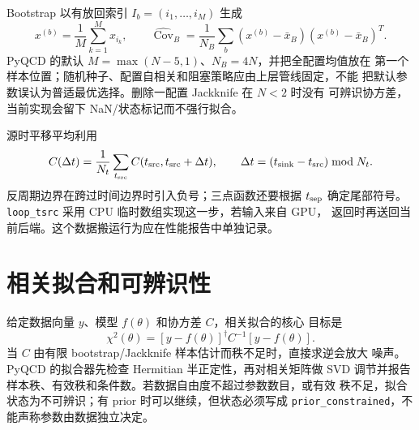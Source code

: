 \documentclass[UTF8,11pt,oneside]{ctexbook}
\begin{document}
Bootstrap 以有放回索引 \(I_b=(i_1,\ldots,i_M)\) 生成
\begin{equation}
 x^{(b)}=\frac1M\sum_{k=1}^{M}x_{i_k},\qquad
 \widehat{\operatorname{Cov}}_B
 =\frac1{N_B}\sum_b(x^{(b)}-\bar x_B)(x^{(b)}-\bar x_B)^T.
\end{equation}
PyQCD 的默认 \(M=\max(N-5,1)\)、\(N_B=4N\)，并把全配置均值放在
第一个样本位置；随机种子、配置自相关和阻塞策略应由上层管线固定，不能
把默认参数误认为普适最优选择。删除一配置 Jackknife 在 \(N<2\) 时没有
可辨识协方差，当前实现会留下 NaN/状态标记而不强行拟合。

源时平移平均利用
\begin{equation}
 C(\Delta t)=\frac1{N_t}\sum_{t_{\rm src}}
 C(t_{\rm src},t_{\rm src}+\Delta t),\qquad
 \Delta t=(t_{\rm sink}-t_{\rm src})\bmod N_t.
\end{equation}
反周期边界在跨过时间边界时引入负号；三点函数还要根据 \(t_{\rm sep}\)
确定尾部符号。\texttt{loop\_tsrc} 采用 CPU 临时数组实现这一步，若输入来自 GPU，
返回时再送回当前后端。这个数据搬运行为应在性能报告中单独记录。

\section{相关拟合和可辨识性}
给定数据向量 \(y\)、模型 \(f(\theta)\) 和协方差 \(C\)，相关拟合的核心
目标是
\begin{equation}
 \chi^2(\theta)=[y-f(\theta)]^\dagger C^{-1}[y-f(\theta)].
 \label{eq:correlated-chi2-clean}
\end{equation}
当 \(C\) 由有限 bootstrap/Jackknife 样本估计而秩不足时，直接求逆会放大
噪声。PyQCD 的拟合器先检查 Hermitian 半正定性，再对相关矩阵做 SVD
调节并报告样本秩、有效秩和条件数。若数据自由度不超过参数数目，或有效
秩不足，拟合状态为不可辨识；有 prior 时可以继续，但状态必须写成
\texttt{prior\_constrained}，不能声称参数由数据独立决定。
\end{document}
